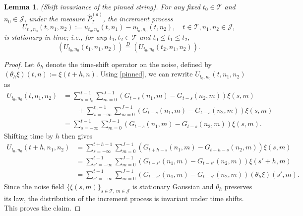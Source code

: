 \documentclass[12pt]{amsart}
\newtheorem{lemma}{Lemma}[section]
\numberwithin{equation}{section}
\newcommand{\1}{\mathbf{1}}
\begin{document}
\begin{lemma}(Shift invariance of the pinned string). For any fixed $t_0\in\mathcal{T}$ and $n_0\in\mathcal{J}$, under the measure $\widehat{P}_T^{(a)}$, the increment process
\begin{equation*}
    U_{t_0,n_0}(t,n_1,n_2):=u_{t_0,n_0}(t,n_1)-u_{t_0,n_0}(t,n_2), \quad t\in\mathcal{T},n_1,n_2\in\mathcal{J},
\end{equation*}
is stationary in time; i.e., for any $t_1,t_2\in\mathcal{T}$ and $t_0\leq t_1\leq t_2$,
\begin{equation*}
    \left(U_{t_0,n_0}(t_1,n_1,n_2)\right)\stackrel{D}{=}\left(U_{t_0,n_0}(t_2,n_1,n_2)\right).
\end{equation*}
\end{lemma}
\begin{proof}
Let $\theta_h$ denote the time-shift operator on the noise, defined by $(\theta_h\xi)(t,n) :=\xi(t+h, n)$. Using \eqref{pinned}, we can rewrite $U_{t_0,n_0}(t,n_1,n_2)$ as
\begin{equation*}
\begin{split}
    U_{t_0,n_0}(t,n_1,n_2)&= \sum_{s=t_0}^{t-1}\sum_{m=0}^{J-1}\left(G_{t-s}(n_1,m)-G_{t-s}(n_2,m)\right)\xi(s,m) \\
    &\quad\quad+ \sum_{s=-\infty}^{t_0-1}\sum_{m=0}^{J-1}\left(G_{t-s}(n_1,m)-G_{t-s}(n_2,m)\right)\xi(s,m)\\
    &=\sum_{s=-\infty}^{t-1}\sum_{m=0}^{J-1}\left(G_{t-s}(n_1,m)-G_{t-s}(n_2,m)\right)\xi(s,m).
\end{split}    
\end{equation*}
Shifting time by $h$ then gives
\begin{equation*}
\begin{split}
  U_{t_0,n_0}(t+h,n_1,n_2) &= \sum_{s=-\infty}^{t+h-1}\sum_{m=0}^{J-1}\left(G_{t+h-s}(n_1,m)-G_{t+h-s}(n_2,m)\right)\xi(s,m)\\
  &=\sum_{s'=-\infty}^{t-1}\sum_{m=0}^{J-1}\left(G_{t-s'}(n_1,m)-G_{t-s'}(n_2,m)\right)\xi(s'+h,m)\\
  &=\sum_{s'=-\infty}^{t-1}\sum_{m=0}^{J-1}\left(G_{t-s'}(n_1,m)-G_{t-s'}(n_2,m)\right)(\theta_h\xi)(s',m).
  \end{split}
\end{equation*}
Since the noise field $\{\xi(s,m)\}_{s\in\mathcal{T},\,m\in\mathcal{J}}$ is stationary Gaussian and $\theta_h$ preserves its law, the distribution of the increment process is invariant under time shifts. This proves the claim.
\end{proof}
\end{document}
